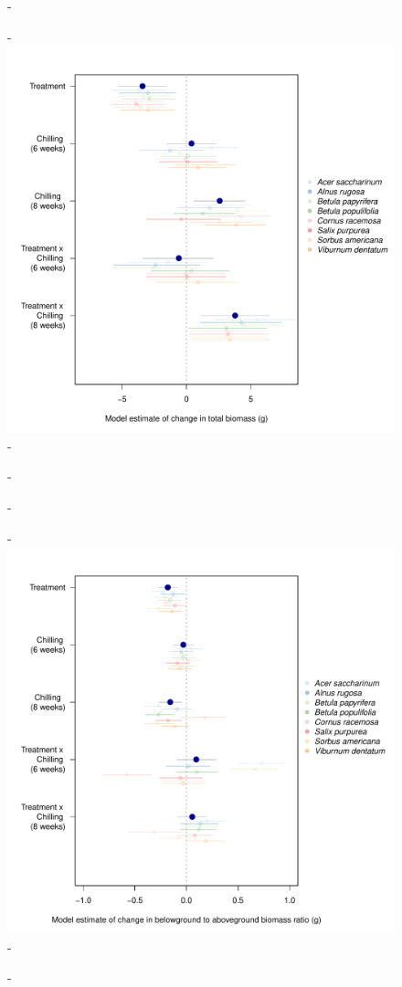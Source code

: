 \documentclass{article}\usepackage[]{graphicx}\usepackage[]{color}
\begin{document}
  {\begin{figure} [H]
  -\begin{center}
  -\includegraphics[width=16cm]{..//analyses/figures/totbiomass_brms.pdf} %
  -\end{center}
  -\end{figure}}
  
  {\begin{figure} [H]
  -\begin{center}
  -\includegraphics[width=16cm]{..//analyses/figures/roottoshoot_brms.pdf} %
  -\end{center}
  -\end{figure}}
\end{document}
